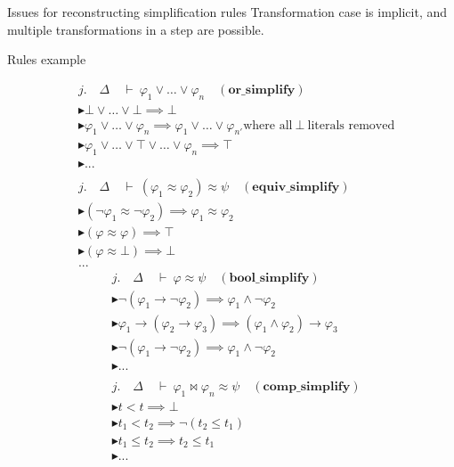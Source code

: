\documentclass[aspectratio=169,xcolor={dvipsnames}]{beamer}
\begin{document}
\begin{frame}{Issues for reconstructing simplification rules}
Transformation case is implicit, and multiple transformations in a step are possible.
\begin{block}{Rules example}

\begin{multicols}{2}
{\tiny
\begin{align*}
& j.\quad \Delta \quad \vdash~ \varphi_1 \lor \dots \lor \varphi_n \quad (\textbf{or\_simplify}) \\
& \blacktriangleright \bot \lor \dots \lor \bot \implies \bot \\
& \blacktriangleright \varphi_1 \lor \dots \lor \varphi_n \implies \varphi_1 \lor \dots \lor \varphi_{n'} \text{where all} ~\bot~ \text{literals removed}\\
& \blacktriangleright \varphi_1 \lor \dots \lor \top \lor \dots \lor \varphi_n \implies \top \\
& \blacktriangleright ... \\
& \\
& j.\quad \Delta \quad \vdash~ (\varphi_1 \approx \varphi_2) \approx \psi \quad (\textbf{equiv\_simplify}) \\
& \blacktriangleright (\neg \varphi_1 \approx \neg \varphi_2) \implies \varphi_1 \approx \varphi_2 \\
& \blacktriangleright (\varphi \approx \varphi) \implies \top \\
& \blacktriangleright (\varphi \approx \bot) \implies \bot \\
& ...
\end{align*}
\begin{align*}
& j.\quad \Delta \quad \vdash~ \varphi \approx \psi \quad (\textbf{bool\_simplify}) \\
& \blacktriangleright \neg (\varphi_1 \rightarrow \neg \varphi_2) \implies  \varphi_1 \land \neg \varphi_2  \\
& \blacktriangleright \varphi_1 \rightarrow (\varphi_2 \rightarrow \varphi_3) \implies  (\varphi_1 \land \varphi_2) \rightarrow \varphi_3 \\
& \blacktriangleright \neg (\varphi_1 \rightarrow \neg \varphi_2) \implies  \varphi_1 \land \neg \varphi_2  \\
& \blacktriangleright ... \\
& \\
& j.\quad \Delta \quad \vdash~ \varphi_1 \bowtie \varphi_n \approx \psi \quad (\textbf{comp\_simplify}) \\
& \blacktriangleright t < t \implies \bot \\
& \blacktriangleright t_1 < t_2 \implies \neg (t_2 \leq t_1) \\
& \blacktriangleright t_1 \leq t_2 \implies t_2 \leq t_1 \\
& \blacktriangleright ...
\end{align*}
}%
\end{multicols}
\end{block}
\end{frame}
\end{document}
